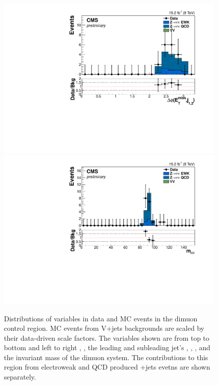 \begin{figure}
  \includegraphics[width=.65\largefigwidth]{plots/parked/HIG-14-038-figs/output_sigreg/mumu_jetmetnomu_mindphi.pdf}
  \includegraphics[width=.65\largefigwidth]{plots/parked/HIG-14-038-figs/output_sigreg/mumu_m_mumu.pdf}
  \caption{Distributions of variables in data and \ac{MC} events in the dimuon control region. \ac{MC} events from V+jets backgrounds are scaled by their data-driven scale factors. The variables shown are from top to bottom and left to right \detajj, \Mjj, the leading and subleading jet's \pt, \METnoMU, \METsig, \jetmetdphileading and the invariant mass of the dimuon system. The contributions to this region from electroweak and \ac{QCD} produced \PZ+jets evetns are shown separately.}
  \label{fig:parkedznunu}
\end{figure}

